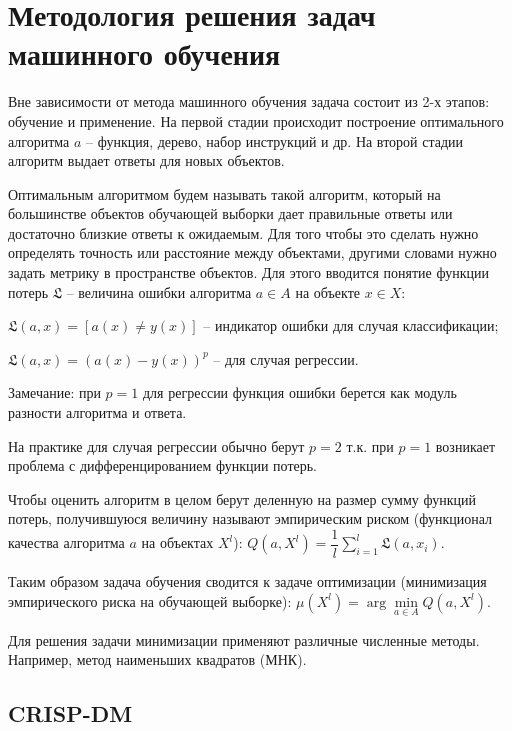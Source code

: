 \section{Методология решения задач машинного обучения}

Вне зависимости от метода машинного обучения задача состоит из 2-х этапов: обучение и применение.
На первой стадии происходит построение оптимального алгоритма $a$ -- функция, дерево, набор инструкций и др. На второй стадии алгоритм выдает ответы для новых объектов.

Оптимальным алгоритмом будем называть такой алгоритм, который на большинстве объектов обучающей выборки дает правильные ответы или достаточно близкие ответы к ожидаемым. Для того чтобы это сделать нужно определять точность или расстояние между объектами, другими словами нужно задать метрику в пространстве объектов. Для этого вводится понятие функции потерь $\mathfrak{L}$ -- величина ошибки алгоритма $a \in A$ на объекте $x \in X$:
\begin{description}[font=$\bullet$]
    \item $\mathfrak{L} (a,x)=[a(x) \neq y(x)]$ -- индикатор ошибки для случая классификации;
    \item $\mathfrak{L} (a,x)= (a(x) - y(x))^p$ -- для случая регрессии.
\end{description}
Замечание: при $p=1$ для регрессии функция ошибки берется как модуль разности алгоритма и ответа.

На практике для случая регрессии обычно берут $p=2$ т.к. при $p=1$ возникает проблема с дифференцированием функции потерь. 

Чтобы оценить алгоритм в целом берут деленную на размер сумму функций потерь, получившуюся величину называют эмпирическим риском (функционал качества алгоритма $a$ на объектах $X^l$): $Q(a, X^l) = \dfrac{1}{l}\sum\limits_{i=1}^{l}\mathfrak{L}(a,x_i)$.

Таким образом задача обучения сводится к задаче оптимизации (минимизация эмпирического риска на обучающей выборке): $\mu(X^l) = \arg\min\limits_{a \in A} Q(a,X^l)$.

Для решения задачи минимизации применяют различные численные методы. Например, метод наименьших квадратов (МНК).


\subsection{CRISP-DM}

